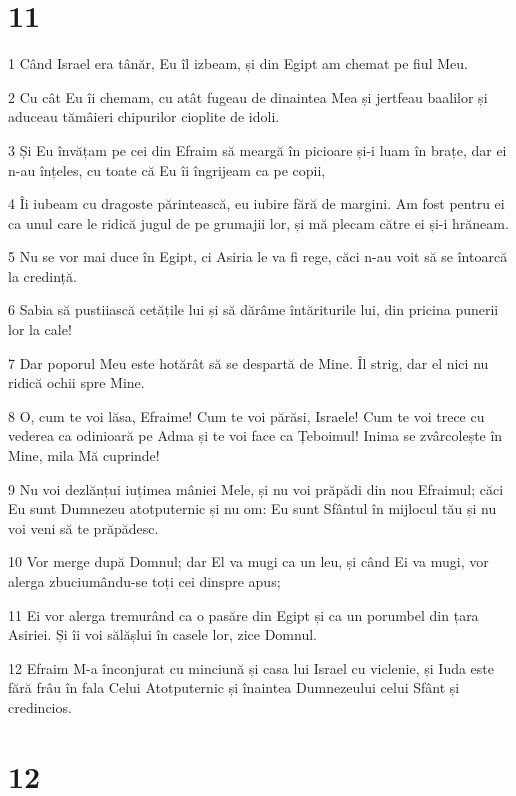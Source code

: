 \chapter{11}

\par 1 Când Israel era tânăr, Eu îl izbeam, și din Egipt am chemat pe fiul Meu.
\par 2 Cu cât Eu îi chemam, cu atât fugeau de dinaintea Mea și jertfeau baalilor și aduceau tămâieri chipurilor cioplite de idoli.
\par 3 Și Eu învățam pe cei din Efraim să meargă în picioare și-i luam în brațe, dar ei n-au înțeles, cu toate că Eu îi îngrijeam ca pe copii,
\par 4 Îi iubeam cu dragoste părintească, eu iubire fără de margini. Am fost pentru ei ca unul care le ridică jugul de pe grumajii lor, și mă plecam către ei și-i hrăneam.
\par 5 Nu se vor mai duce în Egipt, ci Asiria le va fi rege, căci n-au voit să se întoarcă la credință.
\par 6 Sabia să pustiiască cetățile lui și să dărâme întăriturile lui, din pricina punerii lor la cale!
\par 7 Dar poporul Meu este hotărât să se despartă de Mine. Îl strig, dar el nici nu ridică ochii spre Mine.
\par 8 O, cum te voi lăsa, Efraime! Cum te voi părăsi, Israele! Cum te voi trece cu vederea ca odinioară pe Adma și te voi face ca Țeboimul! Inima se zvârcolește în Mine, mila Mă cuprinde!
\par 9 Nu voi dezlănțui iuțimea mâniei Mele, și nu voi prăpădi din nou Efraimul; căci Eu sunt Dumnezeu atotputernic și nu om: Eu sunt Sfântul în mijlocul tău și nu voi veni să te prăpădesc.
\par 10 Vor merge după Domnul; dar El va mugi ca un leu, și când Ei va mugi, vor alerga zbuciumându-se toți cei dinspre apus;
\par 11 Ei vor alerga tremurând ca o pasăre din Egipt și ca un porumbel din țara Asiriei. Și îi voi sălășlui în casele lor, zice Domnul.
\par 12 Efraim M-a înconjurat cu minciună și casa lui Israel cu viclenie, și Iuda este fără frâu în fala Celui Atotputernic și înaintea Dumnezeului celui Sfânt și credincios.

\chapter{12}

